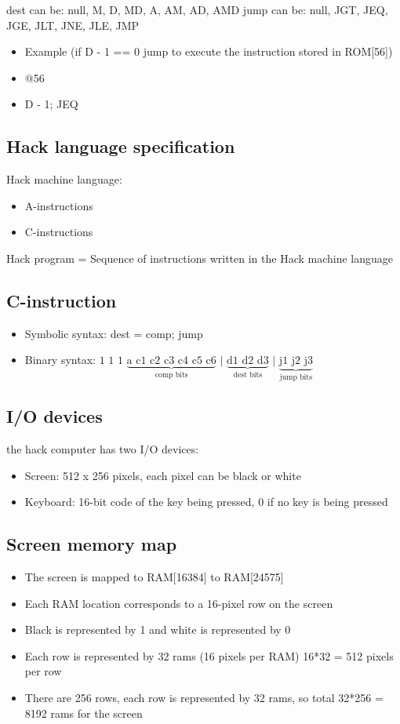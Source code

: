 \documentclass[12pt,a4paper]{article}
\begin{document}
\noindent dest can be: null, M, D, MD, A, AM, AD, AMD
jump can be: null, JGT, JEQ, JGE, JLT, JNE, JLE, JMP

\begin{itemize}
    \item Example (if D - 1 == 0 jump to execute the instruction stored in ROM[56])
    \item @56
    \item D - 1; JEQ 
\end{itemize}

\subsection{Hack language specification}
Hack machine language:
\begin{itemize}
    \item A-instructions
    \item C-instructions
\end{itemize}
Hack program = Sequence of instructions written in the Hack machine language 

\subsection{C-instruction}
\begin{itemize}
    \item Symbolic syntax: dest = comp; jump
    \item Binary syntax: $\text{1 1 1 }\underbrace{\text{a c1 c2 c3 c4 c5 c6}}_{\text{comp bits}} \text{ | } \underbrace{\text{d1 d2 d3}}_{\text{dest bits}} \text{ | } \underbrace{\text{j1 j2 j3}}_{\text{jump bits}}$
\end{itemize}

\subsection{I/O devices}
the hack computer has two I/O devices:
\begin{itemize}
    \item Screen: 512 x 256 pixels, each pixel can be black or white
    \item Keyboard: 16-bit code of the key being pressed, 0 if no key is being pressed
\end{itemize}

\subsection{Screen memory map}
\begin{itemize}
    \item The screen is mapped to RAM[16384] to RAM[24575]
    \item Each RAM location corresponds to a 16-pixel row on the screen
    \item Black is represented by 1 and white is represented by 0
    \item Each row is represented by 32 rams (16 pixels per RAM) 16*32 = 512 pixels per row
    \item There are 256 rows, each row is represented by 32 rams, so total 32*256 = 8192 rams for the screen
\end{itemize}
\end{document}
